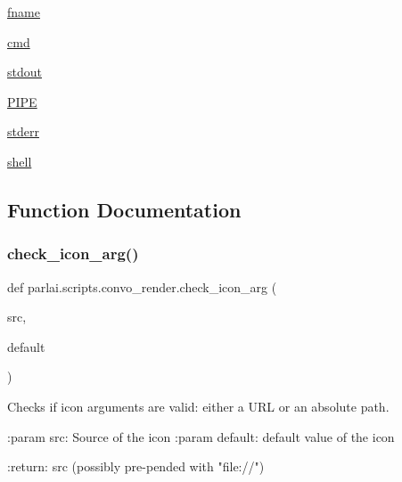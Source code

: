 \begin{DoxyCompactItemize}
\item 
\hyperlink{namespaceparlai_1_1scripts_1_1convo__render_a0f418727dc35abb2a05311377ef8dc1d}{fname}
\item 
\hyperlink{namespaceparlai_1_1scripts_1_1convo__render_a19238415b992fd6dfbb4f8341e4731d1}{cmd}
\item 
\hyperlink{namespaceparlai_1_1scripts_1_1convo__render_a2edb183bdab922bf3744aecb1430986e}{stdout}
\item 
\hyperlink{namespaceparlai_1_1scripts_1_1convo__render_a5841ebb3312b58c9ee1897a8a0eaa656}{P\+I\+PE}
\item 
\hyperlink{namespaceparlai_1_1scripts_1_1convo__render_a85d611f68ace84c18e093f6924395a11}{stderr}
\item 
\hyperlink{namespaceparlai_1_1scripts_1_1convo__render_a16ca84216f37d875ce873f3d693bc76a}{shell}
\end{DoxyCompactItemize}


\subsection{Function Documentation}
\mbox{\label{namespaceparlai_1_1scripts_1_1convo__render_ac7e3c84a7f6e3b488360319b597eda18}} 
\subsubsection{\texorpdfstring{check\+\_\+icon\+\_\+arg()}{check\_icon\_arg()}}
{\footnotesize\ttfamily def parlai.\+scripts.\+convo\+\_\+render.\+check\+\_\+icon\+\_\+arg (\begin{DoxyParamCaption}\item[{}]{src,  }\item[{}]{default }\end{DoxyParamCaption})}

\begin{DoxyVerb}Checks if icon arguments are valid: either a URL or an absolute path.

:param src: Source of the icon
:param default: default value of the icon

:return: src (possibly pre-pended with "file://")
\end{DoxyVerb}
 

